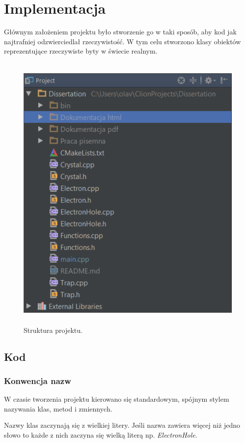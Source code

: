 \chapter{Implementacja}

Głównym założeniem projektu było stworzenie go w taki sposób, aby kod jak najtrafniej odzwierciedlał rzeczywistość. W tym celu stworzono klasy obiektów reprezentujące rzeczywiste byty w świecie realnym.
\begin{figure}[H]
\centering
\includegraphics[width=15cm, height=14cm]{strukturaprojektu}
\caption{Struktura projektu.}
\label{fig:Struktura projektu}
\end{figure}

\section{Kod}
\subsection{Konwencja nazw}
W czasie tworzenia projektu kierowano się standardowym, spójnym stylem nazywania klas, metod i zmiennych.
 
Nazwy klas zaczynają się z wielkiej litery. Jeśli nazwa zawiera więcej niż jedno słowo to każde z nich zaczyna się wielką literą np. \textit{ElectronHole}. 

